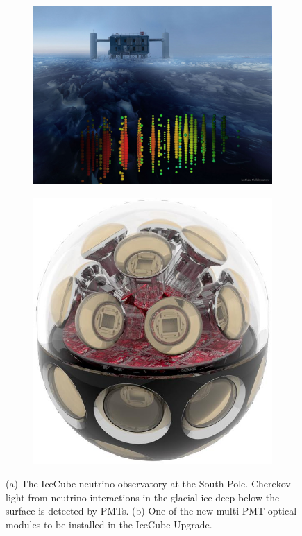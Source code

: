 \documentclass[a4paper,11pt]{article}
\begin{document}
\begin{figure}
    \begin{subfigure}[c]{0.65\textwidth}
    \centering
    \includegraphics[width=0.9\linewidth]{images/IceCube_1200x.jpg}
    \caption{\label{fig:icecube}}
    \end{subfigure}
    \begin{subfigure}[c]{0.35\textwidth}
    \centering
    \includegraphics[width=0.9\linewidth]{images/mdom.jpg}
    \caption{\label{fig:mDOM}}
    \end{subfigure}
    \caption{(a) The IceCube neutrino observatory at the South Pole. Cherekov light from neutrino interactions in the glacial ice deep below the surface is detected by PMTs. (b) One of the new multi-PMT optical modules to be installed in the IceCube Upgrade.}
\end{figure}
\end{document}
